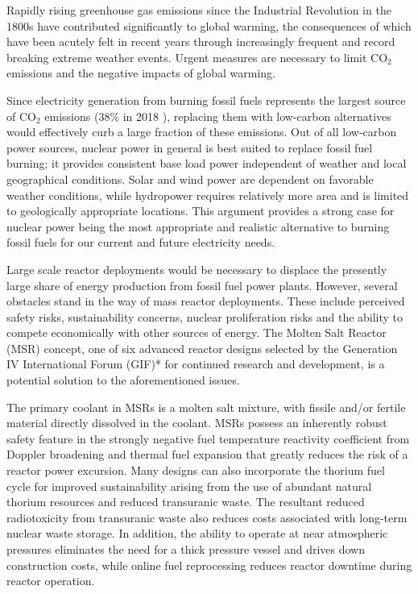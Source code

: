 Rapidly rising greenhouse gas emissions since the Industrial Revolution in the
1800s have contributed significantly to global warming, the consequences of
which have been acutely felt in recent years through increasingly frequent and
record breaking extreme weather events. Urgent measures are necessary to limit
CO$_2$ emissions and the negative impacts of global warming.

Since electricity generation from burning fossil fuels represents the
largest source of CO$_2$ emissions (38\% in 2018 \cite{noauthor_global_2018}), replacing them with
low-carbon
alternatives would effectively curb a large fraction of these emissions. Out
of all low-carbon power sources, nuclear power in general is best suited to
replace fossil fuel burning; it provides consistent base load
power independent of weather and local geographical conditions. Solar and wind
power are dependent on favorable weather conditions, while hydropower requires
relatively more area and is limited
to geologically appropriate locations. This argument
provides a strong case for nuclear power being the most appropriate and
realistic alternative to burning fossil fuels for our current and future
electricity needs.

Large scale reactor deployments would be necessary to displace the
presently large share of energy production from fossil fuel power plants.
However, several obstacles stand in the way of mass reactor deployments. These
include perceived safety risks, sustainability concerns, nuclear proliferation
risks and the ability to compete economically with other sources of energy.
The Molten Salt Reactor (MSR) concept, one of six advanced reactor designs
selected by the Generation IV International Forum
(GIF)* for continued research and development, is a potential solution to the
aforementioned issues.

The primary coolant in MSRs is a molten salt mixture,
with fissile and/or fertile material directly dissolved in the coolant.
MSRs possess an inherently robust safety feature in the
strongly negative fuel temperature reactivity coefficient from Doppler
broadening and thermal fuel expansion that greatly reduces
the risk of a reactor power excursion. Many designs can also incorporate the
thorium fuel cycle for improved sustainability arising from the use of abundant
natural thorium resources and reduced transuranic waste. The resultant reduced
radiotoxicity from transuranic waste also reduces costs associated with
long-term nuclear waste storage.
In addition, the ability to operate at near atmospheric pressures eliminates
the need for a thick pressure vessel and drives down construction
costs, while online fuel reprocessing reduces reactor downtime during reactor
operation.




